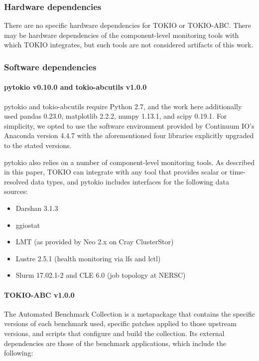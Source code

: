 \subsubsection{Hardware dependencies}

There are no specific hardware dependencies for TOKIO or TOKIO-ABC.
There may be hardware dependencies of the component-level monitoring tools with which TOKIO integrates, but such tools are not considered artifacts of this work.

\subsubsection{Software dependencies}

\paragraph{pytokio v0.10.0 and tokio-abcutils v1.0.0}

pytokio and tokio-abcutils require Python 2.7, and the work here additionally used pandas 0.23.0, matplotlib 2.2.2, numpy 1.13.1, and scipy 0.19.1.
For simplicity, we opted to use the software environment provided by Continuum IO's Anaconda version 4.4.7 with the aforementioned four libraries explicitly upgraded to the stated versions.

pytokio also relies on a number of component-level monitoring tools.
As described in this paper, TOKIO can integrate with any tool that provides scalar or time-resolved data types, and pytokio includes interfaces for the following data sources:

\begin{itemize}
\item Darshan 3.1.3 %
\item ggiostat
\item LMT (as provided by Neo 2.x on Cray ClusterStor) %
\item Lustre 2.5.1 (health monitoring via lfs and lctl)
\item Slurm 17.02.1-2 and CLE 6.0 (job topology at NERSC)
\end{itemize}

\paragraph{TOKIO-ABC v1.0.0} The Automated Benchmark Collection is a metapackage that contains the specific versions of each benchmark used, specific patches applied to those upstream versions, and scripts that configure and build the collection.
Its external dependencies are those of the benchmark applications, which include the following:

